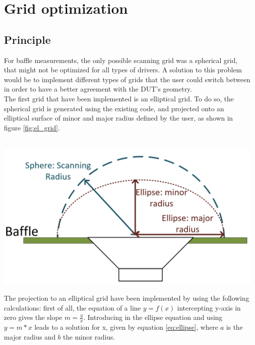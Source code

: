 \documentclass{report}
\begin{document}
\section{Grid optimization}

\subsection{Principle}
\begin{minipage}{0.6\textwidth}
For baffle measurements, the only possible scanning grid was a spherical grid, that might not be optimized for all types of drivers. A solution to this problem would be to implement different types of grids that the user could switch between in order to have a better agreement with the DUT's geometry. \\
The first grid that have been implemented is an elliptical grid. To do so, the spherical grid is generated using the existing code, and projected onto an elliptical surface of minor and major radius defined by the user, as shown in figure \ref{fig:el_grid}. \\~\\
\end{minipage}
\begin{minipage}{0.4\textwidth}
\begin{center}
	\includegraphics[scale=0.21]{GridOpti/El_Grid_Draw} 
    \captionsetup{hypcap=false} 
	\label{fig:el_grid}
\end{center}
\end{minipage}

The projection to an elliptical grid have been implemented by using the following calculations: first of all, the equation of a line $y = f(x)$ intercepting y-axis in zero gives the slope $m = \frac{y}{x}$. Introducing in the ellipse equation and using $y = m*x$ leads to a solution for x, given by equation \ref{eq:ellipse}, where $a$ is the major radius and $b$ the minor radius.
\end{document}

